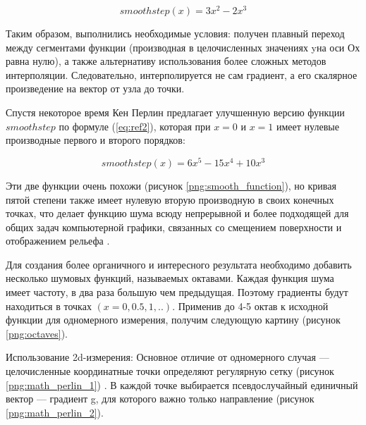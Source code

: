 \begin{equation}
	smoothstep(x) = 3x^2 - 2x^3
	\label{eq:ref1}
\end{equation}
 
Таким образом, выполнились необходимые условия: получен плавный переход между сегментами функции (производная в целочисленных значениях yна оси Ох равна нулю), а также альтернативу использования более сложных методов интерполяции. Следовательно, интерполируется не сам градиент, а его скалярное произведение на вектор от узла до точки. 

Спустя некоторое время Кен Перлин предлагает улучшенную версию функции $smoothstep$ по формуле (\ref{eq:ref2}), которая при $x = 0$ и $x = 1$ имеет нулевые производные первого и второго порядков:

\begin{equation}
	smoothstep(x) = 6x^5 - 15x^4 + 10x^3
	\label{eq:ref2}
\end{equation}

Эти две функции очень похожи (рисунок \ref{png:smooth_function}), но кривая пятой степени также имеет нулевую вторую производную в своих конечных точках, что делает функцию шума всюду непрерывной и более подходящей для общих задач компьютерной графики, связанных со смещением поверхности и отображением рельефа \cite{improved_perlin_noise}.

\begin{figure}[H]
\end{figure}

Для создания более органичного и интересного результата необходимо добавить несколько шумовых функций, называемых октавами. Каждая функция шума имеет частоту, в два раза большую чем предыдущая. Поэтому градиенты будут находиться в точках $(x = 0, 0.5, 1,..)$. Применив до 4-5 октав к исходной функции для одномерного измерения, получим следующую картину (рисунок \ref{png:octaves}).

\begin{figure}[H]
\end{figure}

Использование 2d-измерения:
Основное отличие от одномерного случая — целочисленные координатные точки определяют регулярную сетку (рисунок \ref{png:math_perlin_1}) \cite{math_perlin_noise}. В каждой точке выбирается псевдослучайный единичный вектор — градиент g, для которого важно только направление (рисунок \ref{png:math_perlin_2}). 

